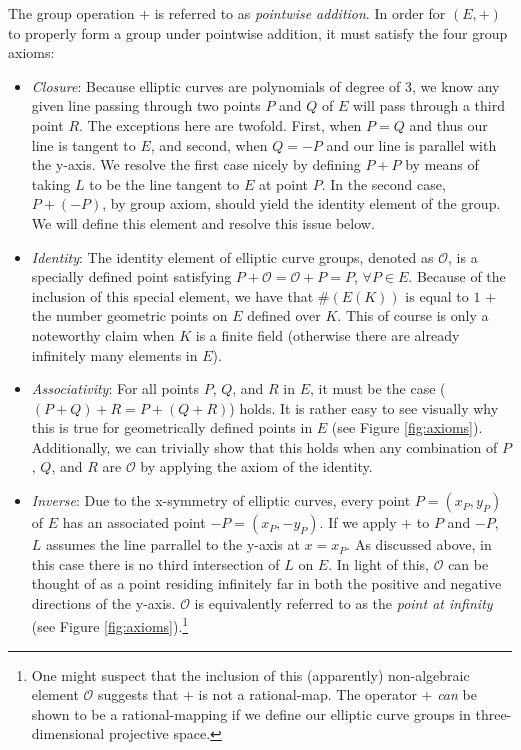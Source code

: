 The group operation $+$ is referred to as \emph{pointwise addition}. In order for $(E,+)$ to properly form a group under pointwise addition, it must satisfy the four group axioms:
\begin{itemize}
\item \emph{Closure}: Because elliptic curves are polynomials of degree of 3, we know any given line passing through two points $P$ and $Q$ of $E$ will pass through a third point $R$. The exceptions here are twofold. First, when $P = Q$ and thus our line is tangent to $E$, and second, when $Q = -P$ and our line is parallel with the y-axis. We resolve the first case nicely by defining $P + P$ by means of taking $L$ to be the line tangent to $E$ at point $P$. In the second case, $P + (-P)$, by group axiom, should yield the identity element of the group. We will define this element and resolve this issue below.
\item \emph{Identity}: The identity element of elliptic curve groups, denoted as $\mathcal{O}$, is a specially defined point satisfying $P + \mathcal{O} = \mathcal{O} + P = P$, $\forall P \in E$. Because of the inclusion of this special element, we have that $\#(E(K))$ is equal to $1$ $+$ the number geometric points on $E$ defined over $K$. This of course is only a noteworthy claim when $K$ is a finite field (otherwise there are already infinitely many elements in $E$).
\item \emph{Associativity}: For all points $P$, $Q$, and $R$ in $E$, it must be the case ($(P + Q) + R = P + (Q + R)$) holds. It is rather easy to see visually why this is true for geometrically defined points in $E$ (see Figure \ref{fig:axioms}). Additionally, we can trivially show that this holds when any combination of $P$, $Q$, and $R$ are $\mathcal{O}$ by applying the axiom of the identity.
\item \emph{Inverse}: Due to the x-symmetry of elliptic curves, every point $P = (x_P, y_P)$ of $E$ has an associated point $-P = (x_P, -y_P)$. If we apply $+$ to $P$ and $-P$, $L$ assumes the line parrallel to the y-axis at $x = x_P$. As discussed above, in this case there is no third intersection of $L$ on $E$. In light of this, $\mathcal{O}$ can be thought of as a point residing infinitely far in both the positive and negative directions of the y-axis. $\mathcal{O}$ is equivalently referred to as the \emph{point at infinity} (see Figure \ref{fig:axioms}).\footnote{One might suspect that the inclusion of this (apparently) non-algebraic element $\mathcal{O}$ suggests that $+$ is not a rational-map. The operator $+$ \emph{can} be shown to be a rational-mapping if we define our elliptic curve groups in three-dimensional projective space.}
\end{itemize}


